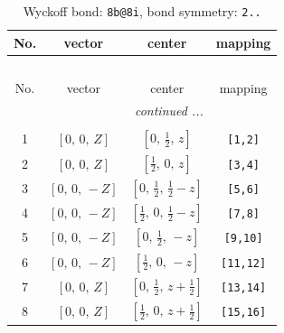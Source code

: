 \documentclass[fleqn,8pt]{jsarticle}
\begin{document}
\renewcommand{\arraystretch}{1.2}
\begin{longtable}{cccc}
\caption{Wyckoff bond: {\tt 8b@8i}, bond symmetry: {\tt 2..}}
 \\
 \hline \hline
No. & vector & center & mapping \\ \hline \endfirsthead

\multicolumn{3}{l}{\tablename\ \thetable{}} \\
 \hline \hline
No. & vector & center & mapping \\ \hline \endhead

 \hline \hline
\multicolumn{3}{r}{\footnotesize\it continued ...} \\ \endfoot

 \hline \hline
\multicolumn{3}{r}{} \\ \endlastfoot

1 & $\left[ 0,\, 0,\, Z \right]$ & $\left[ 0,\, \frac{1}{2},\, z \right]$ & {\tt [1,2]} \\ \hline
2 & $\left[ 0,\, 0,\, Z \right]$ & $\left[ \frac{1}{2},\, 0,\, z \right]$ & {\tt [3,4]} \\ \hline
3 & $\left[ 0,\, 0,\, - Z \right]$ & $\left[ 0,\, \frac{1}{2},\, \frac{1}{2} - z \right]$ & {\tt [5,6]} \\ \hline
4 & $\left[ 0,\, 0,\, - Z \right]$ & $\left[ \frac{1}{2},\, 0,\, \frac{1}{2} - z \right]$ & {\tt [7,8]} \\ \hline
5 & $\left[ 0,\, 0,\, - Z \right]$ & $\left[ 0,\, \frac{1}{2},\, - z \right]$ & {\tt [9,10]} \\ \hline
6 & $\left[ 0,\, 0,\, - Z \right]$ & $\left[ \frac{1}{2},\, 0,\, - z \right]$ & {\tt [11,12]} \\ \hline
7 & $\left[ 0,\, 0,\, Z \right]$ & $\left[ 0,\, \frac{1}{2},\, z + \frac{1}{2} \right]$ & {\tt [13,14]} \\ \hline
8 & $\left[ 0,\, 0,\, Z \right]$ & $\left[ \frac{1}{2},\, 0,\, z + \frac{1}{2} \right]$ & {\tt [15,16]} \\
\end{longtable}
\renewcommand{\arraystretch}{1.2}
\end{document}
